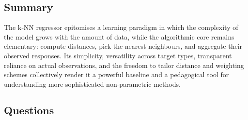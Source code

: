 \documentclass[12pt, a4paper]{article}
\begin{document}
\subsection{Summary}
The k‑NN regressor epitomises a learning paradigm in which the complexity of the model grows with the amount of data, while the algorithmic core remains elementary: compute distances, pick the nearest neighbours, and aggregate their observed responses.  Its simplicity, versatility across target types, transparent reliance on actual observations, and the freedom to tailor distance and weighting schemes collectively render it a powerful baseline and a pedagogical tool for understanding more sophisticated non‑parametric methods.

\subsection*{Questions}
\end{document}
